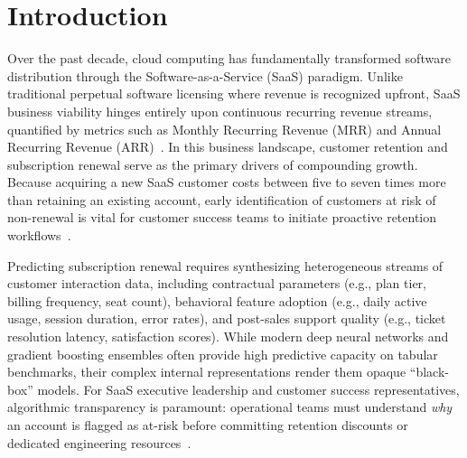 \documentclass[pdflatex,sn-mathphys-num]{sn-jnl}
\begin{document}

\maketitle

\section{Introduction}\label{sec:intro}
Over the past decade, cloud computing has fundamentally transformed software distribution through the Software-as-a-Service (SaaS) paradigm. Unlike traditional perpetual software licensing where revenue is recognized upfront, SaaS business viability hinges entirely upon continuous recurring revenue streams, quantified by metrics such as Monthly Recurring Revenue (MRR) and Annual Recurring Revenue (ARR)~\cite{verbeke2012building}. In this business landscape, customer retention and subscription renewal serve as the primary drivers of compounding growth. Because acquiring a new SaaS customer costs between five to seven times more than retaining an existing account, early identification of customers at risk of non-renewal is vital for customer success teams to initiate proactive retention workflows~\cite{coussement2013customer}.

Predicting subscription renewal requires synthesizing heterogeneous streams of customer interaction data, including contractual parameters (e.g., plan tier, billing frequency, seat count), behavioral feature adoption (e.g., daily active usage, session duration, error rates), and post-sales support quality (e.g., ticket resolution latency, satisfaction scores). While modern deep neural networks and gradient boosting ensembles often provide high predictive capacity on tabular benchmarks, their complex internal representations render them opaque ``black-box'' models. For SaaS executive leadership and customer success representatives, algorithmic transparency is paramount: operational teams must understand \textit{why} an account is flagged as at-risk before committing retention discounts or dedicated engineering resources~\cite{verbeke2012building,vafeiadis2015comparison}.
\end{document}
